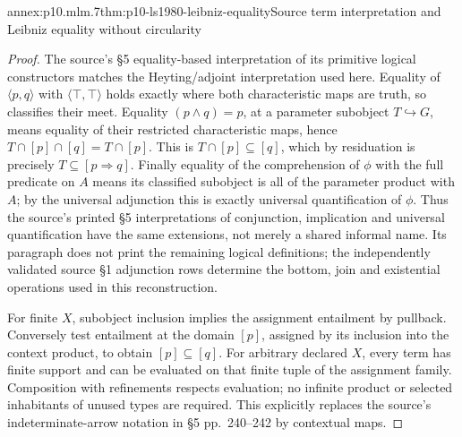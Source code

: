 \begin{annexitem}{annex:p10.mlm.7}{thm:p10-ls1980-leibniz-equality}{Source term interpretation and Leibniz equality without circularity}
\begin{proof}
The source's \S5 equality-based interpretation of its primitive logical
constructors matches the Heyting/adjoint interpretation used here.
Equality of \(\langle p,q\rangle\) with \(\langle\top,\top\rangle\) holds
exactly where both characteristic maps are truth, so classifies their meet.
Equality \((p\wedge q)=p\), at a parameter subobject \(T\hookrightarrow G\),
means equality of their restricted characteristic maps, hence
\(T\cap[p]\cap[q]=T\cap[p]\). This is \(T\cap[p]\subseteq[q]\), which
by residuation is precisely \(T\subseteq[p\Rightarrow q]\).
Finally equality of the comprehension of \(\phi\) with the full predicate
on \(A\) means its classified subobject is all of the parameter product
with \(A\); by the universal adjunction this is exactly universal
quantification of \(\phi\). Thus the source's printed \S5 interpretations
of conjunction, implication and universal quantification have the same
extensions, not merely a shared informal name. Its paragraph does not print
the remaining logical definitions; the independently validated source
\S1 adjunction rows determine the bottom, join and existential operations
used in this reconstruction.

For finite \(X\), subobject inclusion implies the assignment entailment by
pullback. Conversely test entailment at the domain \([p]\), assigned by its
inclusion into the context product, to obtain \([p]\subseteq[q]\).
For arbitrary declared \(X\), every term has finite support and can be
evaluated on that finite tuple of the assignment family. Composition with
refinements respects evaluation; no infinite product or selected inhabitants
of unused types are required. This explicitly replaces the source's
indeterminate-arrow notation in \S5 pp.~240--242 by contextual maps.
\end{proof}
\end{annexitem}

